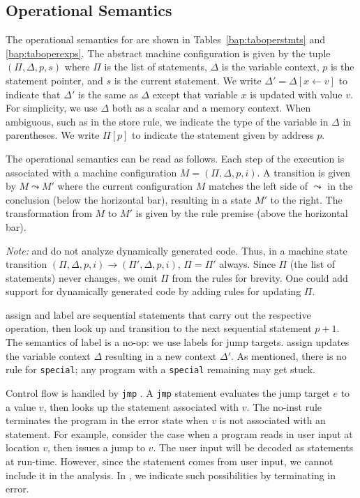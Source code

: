 \subsection{Operational Semantics}
\label{vine:operational}



The operational semantics for \bil are shown in
Tables~\ref{bap:taboperstmts} and \ref{bap:taboperexps}.  The abstract
machine configuration is given by the tuple $(\Pi, \Delta, p, s)$
where $\Pi$ is the list of statements, $\Delta$ is the variable
context, $p$ is the statement pointer, and $s$ is the current
statement.  We write $\Delta' = \Delta[x \leftarrow v]$ to indicate
that $\Delta'$ is the same as $\Delta$ except that variable $x$ is
updated with value $v$.  For simplicity, we use $\Delta$ both as a
scalar and a memory context. When ambiguous, such as in the {\sc
  store} rule, we indicate the type of the variable in $\Delta$ in
parentheses. We write $\Pi[p]$ to indicate the statement given by
address $p$.

The operational semantics can be read as follows.  Each step of the
execution is associated with a machine configuration $M = (\Pi,
\Delta, p, i)$.  A transition is given by $M \leadsto M'$ where the
current configuration $M$ matches the left side of $\leadsto$ in the
conclusion (below the horizontal bar), resulting in a state $M'$ to
the right.  The transformation from $M$ to $M'$ is given by the rule
premise (above the horizontal bar). 

{\it Note:} \bap and \bil do not analyze dynamically generated
code. Thus, in a machine state transition $(\Pi, \Delta, p, i)
\rightarrow (\Pi', \Delta, p, i)$, $\Pi = \Pi'$ always. Since $\Pi$
(the list of statements) never changes, we omit $\Pi$ from the rules
for brevity. One could add support for dynamically generated code by
adding rules for updating $\Pi$. 


{\sc assign} and {\sc label} are sequential statements that carry
out the respective operation, then look up and transition to the next
sequential statement $p+1$. The semantics of {\sc label} is a no-op:
we use labels for jump targets.  {\sc assign} updates the variable
context $\Delta$ resulting in a new context $\Delta'$.  As mentioned,
there is no rule for {\tt special}; any program with a {\tt special}
remaining may get stuck.

Control flow is handled by {\tt jmp}%
. A {\tt jmp} statement
evaluates the jump target $e$ to a value $v$, then looks up the
statement associated with $v$.  The {\sc no-inst} rule terminates
the program in the error state when $v$ is not associated with an
statement. For example, consider the case when a program reads in
user input at location $v$, then issues a jump to $v$.  The user input
will be decoded as statements at run-time.  However, since the
statement comes from user input, we cannot include it in the analysis. In
\bap, we indicate such possibilities by terminating in error.




%

